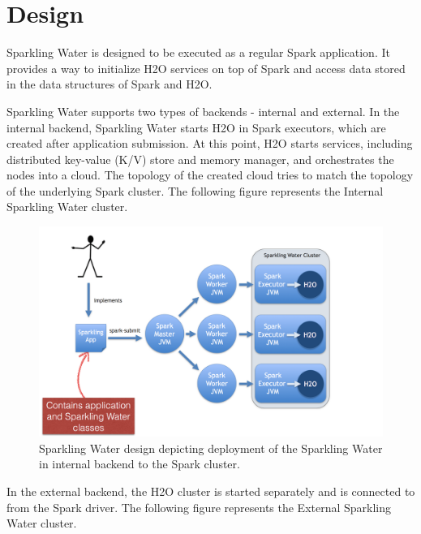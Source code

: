 \documentclass{standalone}
\begin{document}
    \section{Design}
    Sparkling Water is designed to be executed as a regular Spark application. It provides a way to initialize H2O
    services on top of Spark and access data stored in the data structures of Spark and H2O.

    Sparkling Water supports two types of backends - internal and external. In the internal backend, Sparkling Water starts
    H2O in Spark executors, which are created after application submission. At this point, H2O starts services,
    including distributed key-value (K/V) store and memory manager, and orchestrates the nodes into a cloud.
    The topology of the created cloud tries to match the topology of the underlying Spark cluster.
    The following figure represents the Internal Sparkling Water cluster.


    \begin{figure}[h!]
        \centering
        \includegraphics[scale=0.6]{../images/Topology-internal.png}
        \caption{Sparkling Water design depicting deployment of the Sparkling Water in internal backend to the Spark cluster.}
    \end{figure}

    In the external backend, the H2O cluster is started separately and is connected to from the Spark driver. The
    following figure represents the External Sparkling Water cluster.
\end{document}

